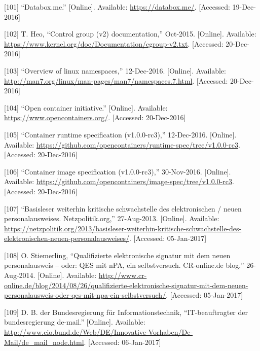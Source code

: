 \documentclass[12pt,english,a4paper,titlepage,cleardoublepage=empty,dottedtoc]{report}
\begin{document}
\hypertarget{ref-web_2016_demo_databox}{}
{[}101{]} ``Databox.me.'' {[}Online{]}. Available:
\url{https://databox.me/}. {[}Accessed: 19-Dec-2016{]}

\hypertarget{ref-web_2015_cgroup-doc}{}
{[}102{]} T. Heo, ``Control group (v2) documentation,'' Oct-2015.
{[}Online{]}. Available:
\url{https://www.kernel.org/doc/Documentation/cgroup-v2.txt}.
{[}Accessed: 20-Dec-2016{]}

\hypertarget{ref-web_2016_kernel-namespace}{}
{[}103{]} ``Overview of linux namespaces,'' 12-Dec-2016. {[}Online{]}.
Available: \url{http://man7.org/linux/man-pages/man7/namespaces.7.html}.
{[}Accessed: 20-Dec-2016{]}

\hypertarget{ref-web_2016_open-container-initiative}{}
{[}104{]} ``Open container initiative.'' {[}Online{]}. Available:
\url{https://www.opencontainers.org/}. {[}Accessed: 20-Dec-2016{]}

\hypertarget{ref-web_oci-spec_runtime}{}
{[}105{]} ``Container runtime specification (v1.0.0-rc3),'' 12-Dec-2016.
{[}Online{]}. Available:
\url{https://github.com/opencontainers/runtime-spec/tree/v1.0.0-rc3}.
{[}Accessed: 20-Dec-2016{]}

\hypertarget{ref-web_oci-spec_image}{}
{[}106{]} ``Container image specification (v1.0.0-rc3),'' 30-Nov-2016.
{[}Online{]}. Available:
\url{https://github.com/opencontainers/image-spec/tree/v1.0.0-rc3}.
{[}Accessed: 20-Dec-2016{]}

\hypertarget{ref-web_2013_npa-sicherheitsdefizit}{}
{[}107{]} ``Basisleser weiterhin kritische schwachstelle des
elektronischen / neuen personalausweises. Netzpolitik.org,''
27-Aug-2013. {[}Online{]}. Available:
\url{https://netzpolitik.org/2013/basisleser-weiterhin-kritische-schwachstelle-des-elektronischen-neuen-personalausweises/}.
{[}Accessed: 05-Jan-2017{]}

\hypertarget{ref-web_2014_test-qes-support-in-npa}{}
{[}108{]} O. Stiemerling, ``Qualifizierte elektronische signatur mit dem
neuen personalausweis -- oder: QES mit nPA, ein selbstversuch.
CR-online.de blog,'' 26-Aug-2014. {[}Online{]}. Available:
\url{http://www.cr-online.de/blog/2014/08/26/qualifizierte-elektronische-signatur-mit-dem-neuen-personalausweis-oder-qes-mit-npa-ein-selbstversuch/}.
{[}Accessed: 05-Jan-2017{]}

\hypertarget{ref-web_2017_about-de-mail}{}
{[}109{]} D. B. der Bundesregierung für Informationstechnik,
``IT-beauftragter der bundesregierung de-mail.'' {[}Online{]}.
Available:
\url{http://www.cio.bund.de/Web/DE/Innovative-Vorhaben/De-Mail/de_mail_node.html}.
{[}Accessed: 06-Jan-2017{]}
\end{document}
